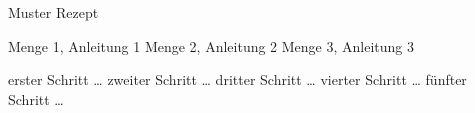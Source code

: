 \begin{recipe}{Muster Rezept}

     Menge 1, Anleitung 1
     Menge 2, Anleitung 2
     Menge 3, Anleitung 3
    \ingredient{}
    \ingredient{}

    \onestar
    \twostar
    \threestar
    \fourstar
    \fivestar
    \ingredient{}
    \ingredient{}

     erster Schritt \dots
     zweiter Schritt \dots
     dritter Schritt \dots
     vierter Schritt \dots
     fünfter Schritt \dots

\end{recipe}
